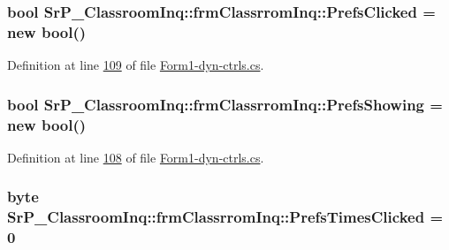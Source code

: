 \hypertarget{class_sr_p___classroom_inq_1_1frm_classrrom_inq_a9e5a6ce376468f2e13dae9f60e86ccf6}{
\subsubsection[{\-Prefs\-Clicked}]{\setlength{\rightskip}{0pt plus 5cm}bool {\bf \-Sr\-P\-\_\-\-Classroom\-Inq\-::frm\-Classrrom\-Inq\-::\-Prefs\-Clicked} = new bool()}}
\label{class_sr_p___classroom_inq_1_1frm_classrrom_inq_a9e5a6ce376468f2e13dae9f60e86ccf6}


\-Definition at line \hyperlink{_form1-dyn-ctrls_8cs_source_l00109}{109} of file \hyperlink{_form1-dyn-ctrls_8cs_source}{\-Form1-\/dyn-\/ctrls.\-cs}.

\hypertarget{class_sr_p___classroom_inq_1_1frm_classrrom_inq_a915bf1ba42b54c697d1d90043610385f}{
\subsubsection[{\-Prefs\-Showing}]{\setlength{\rightskip}{0pt plus 5cm}bool {\bf \-Sr\-P\-\_\-\-Classroom\-Inq\-::frm\-Classrrom\-Inq\-::\-Prefs\-Showing} = new bool()}}
\label{class_sr_p___classroom_inq_1_1frm_classrrom_inq_a915bf1ba42b54c697d1d90043610385f}


\-Definition at line \hyperlink{_form1-dyn-ctrls_8cs_source_l00108}{108} of file \hyperlink{_form1-dyn-ctrls_8cs_source}{\-Form1-\/dyn-\/ctrls.\-cs}.

\hypertarget{class_sr_p___classroom_inq_1_1frm_classrrom_inq_a649306fdbca853561ee4a6cac829315a}{
\subsubsection[{\-Prefs\-Times\-Clicked}]{\setlength{\rightskip}{0pt plus 5cm}byte {\bf \-Sr\-P\-\_\-\-Classroom\-Inq\-::frm\-Classrrom\-Inq\-::\-Prefs\-Times\-Clicked} = 0}}
\label{class_sr_p___classroom_inq_1_1frm_classrrom_inq_a649306fdbca853561ee4a6cac829315a}


